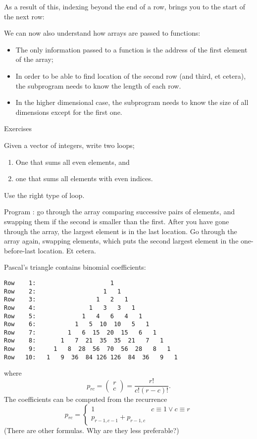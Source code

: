 As a result of this, indexing beyond the end of a row, brings you to the
start of the next row:
%

We can now also understand how arrays are passed to functions:
\begin{itemize}
\item The only information passed to a function is the address of the
  first element of the array;
\item In order to be able to find location of the second row (and
  third, et cetera), the subprogram needs to know the length of each
  row.
\item In the higher dimensional case, the subprogram needs to know the
  size of all dimensions except for the first one.
\end{itemize}

 {Exercises}

\begin{exercise}
  \label{ex:even-index}
  Given a vector of integers, write two loops;
  \begin{enumerate}
  \item One that sums all even elements, and
  \item one that sums all elements with even indices.
  \end{enumerate}
  Use the right type of loop.
\end{exercise}

\begin{exercise}
  Program : go through the array comparing
  successive pairs of elements, and swapping them if the second is
  smaller than the first. After you have gone through the array, the
  largest element is in the last location. Go through the array again,
  swapping elements, which puts the second largest element in the
  one-before-last location. Et cetera.
\end{exercise}

\begin{block}{Pascal's triangle}
  \label{sl:pascal-def}
  \small
   contains binomial coefficients:
{\scriptsize
\begin{verbatim}
Row    1:                     1
Row    2:                   1   1
Row    3:                 1   2   1
Row    4:               1   3   3   1
Row    5:             1   4   6   4   1
Row    6:           1   5  10  10   5   1
Row    7:         1   6  15  20  15   6   1
Row    8:       1   7  21  35  35  21   7   1
Row    9:     1   8  28  56  70  56  28   8   1
Row   10:   1   9  36  84 126 126  84  36   9   1
\end{verbatim}
}
where \[ p_{rc} = \begin{pmatrix} r\\c \end{pmatrix} = \frac{r!}{c!(r-c)! }. \]
The coefficients can be computed from the recurrence
\[ p_{rc} = 
\begin{cases}
  1&c\equiv 1\vee c\equiv r\\
  p_{r-1,c-1}+p_{r-1,c}
\end{cases}
\]
(There are other formulas. Why are they less preferable?)
\end{block}


